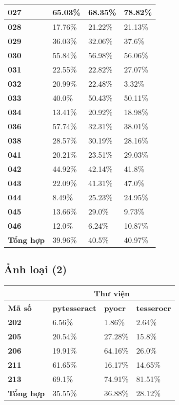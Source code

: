 \documentclass[12pt,a4paper]{article}
\begin{document}
\begin{longtable}{|p{}|p{}|p{}|p{}|}
\hline \textbf{027} & 65.03\% & 68.35\% & 78.82\% \\
\hline \textbf{028} & 17.76\% & 21.22\% & 21.13\% \\
\hline \textbf{029} & 36.03\% & 32.06\% & 37.6\% \\
\hline \textbf{030} & 55.84\% & 56.98\% & 56.06\% \\
\hline \textbf{031} & 22.55\% & 22.82\% & 27.07\% \\
\hline \textbf{032} & 20.99\% & 22.48\% & 3.32\% \\
\hline \textbf{033} & 40.0\% & 50.43\% & 50.11\% \\
\hline \textbf{034} & 13.41\% & 20.92\% & 18.98\% \\
\hline \textbf{036} & 57.74\% & 32.31\% & 38.01\% \\
\hline \textbf{038} & 28.57\% & 30.19\% & 28.16\% \\
\hline \textbf{041} & 20.21\% & 23.51\% & 29.03\% \\
\hline \textbf{042} & 44.92\% & 42.14\% & 41.8\% \\
\hline \textbf{043} & 22.09\% & 41.31\% & 47.0\% \\
\hline \textbf{044} & 8.49\% & 25.23\% & 24.95\% \\
\hline \textbf{045} & 13.66\% & 29.0\% & 9.73\% \\
\hline \textbf{046} & 12.0\% & 6.24\% & 10.87\% \\
\hline \textbf{Tổng hợp} & 39.96\% & 40.5\% & 40.97\% \\
\hline
\end{longtable}

\subsection{Ảnh loại (2)}

\begin{longtable}{|p{}|p{}|p{}|p{}|}
\hline & \multicolumn{3}{c|}{Thư viện} \\
\hline \textbf{Mã số} & \textbf{pytesseract} & \textbf{pyocr} & \textbf{tesserocr} \\
\hline \textbf{202} & 6.56\% & 1.86\% & 2.64\% \\
\hline \textbf{205} & 20.54\% & 27.28\% & 15.8\% \\
\hline \textbf{206} & 19.91\% & 64.16\% & 26.0\% \\
\hline \textbf{211} & 61.65\% & 16.17\% & 14.65\% \\
\hline \textbf{213} & 69.1\% & 74.91\% & 81.51\% \\
\hline \textbf{Tổng hợp} & 35.55\% & 36.88\% & 28.12\% \\
\hline
\end{longtable}
\end{document}
